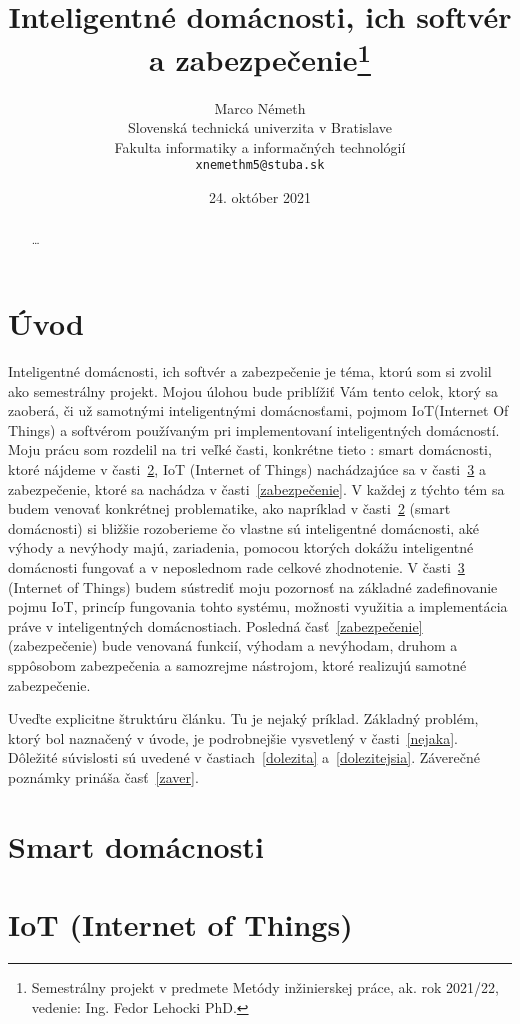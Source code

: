 \documentclass[10pt,twoside,slovak,a4paper]{article}
\title{Inteligentné domácnosti, ich softvér a zabezpečenie\thanks{Semestrálny projekt v predmete Metódy inžinierskej práce, ak. rok 2021/22, vedenie: Ing. Fedor Lehocki PhD.}} %
\author{Marco Németh\\[2pt]
	{\small Slovenská technická univerzita v Bratislave}\\
	{\small Fakulta informatiky a informačných technológií}\\
	{\small \texttt{xnemethm5@stuba.sk}}
	}
\date{\small 24. október 2021} %
\begin{document}
\maketitle

\begin{abstract}
\ldots
\end{abstract}



\section{Úvod}

Inteligentné domácnosti, ich softvér a zabezpečenie je téma, ktorú som si zvolil ako semestrálny projekt. Mojou úlohou bude priblížiť Vám tento celok, ktorý sa zaoberá, či už samotnými inteligentnými domácnosťami, pojmom IoT(Internet Of Things) a softvérom používaným pri implementovaní inteligentných domácností. 
Moju prácu som rozdelil na tri veľké časti, konkrétne tieto : smart domácnosti, ktoré nájdeme v časti~\ref{domácnosti}, IoT (Internet of Things) nachádzajúce sa v časti~\ref{IoT}  a zabezpečenie, ktoré sa nachádza v časti~\ref{zabezpečenie}. V každej z týchto tém sa budem venovať konkrétnej problematike, ako napríklad v časti~\ref{domácnosti} (smart domácnosti) si bližšie rozoberieme čo vlastne sú inteligentné domácnosti, aké výhody a nevýhody majú, zariadenia, pomocou ktorých dokážu inteligentné domácnosti fungovať a v neposlednom rade celkové zhodnotenie. V časti~\ref{IoT} (Internet of Things) budem sústrediť moju pozornosť na základné zadefinovanie pojmu IoT, princíp fungovania tohto systému, možnosti využitia a implementácia práve v inteligentných domácnostiach. 
Posledná časť~\ref{zabezpečenie} (zabezpečenie) bude venovaná funkcií, výhodam a nevýhodam, druhom a sppôsobom zabezpečenia a samozrejme nástrojom, ktoré realizujú samotné zabezpečenie.

Uveďte explicitne štruktúru článku. Tu je nejaký príklad.
Základný problém, ktorý bol naznačený v úvode, je podrobnejšie vysvetlený v časti~\ref{nejaka}.
Dôležité súvislosti sú uvedené v častiach~\ref{dolezita} a~\ref{dolezitejsia}.
Záverečné poznámky prináša časť~\ref{zaver}.

\section{Smart domácnosti}\label{domácnosti}

\section{IoT (Internet of Things)}\label{IoT}
\end{document}
